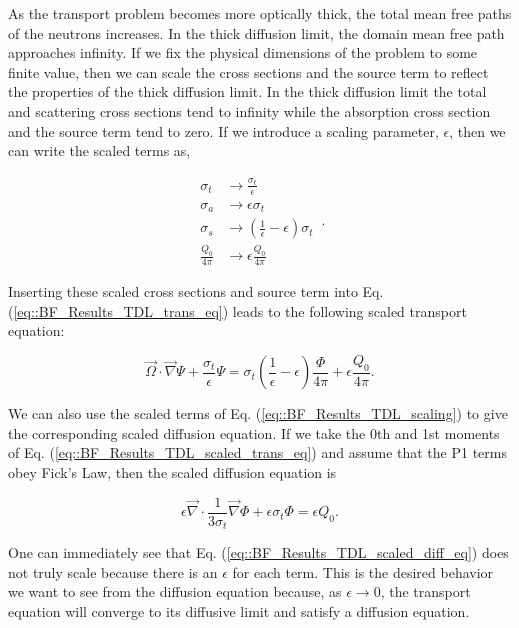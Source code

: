 \noindent As the transport problem becomes more optically thick, the total mean free paths of the neutrons increases. In the thick diffusion limit, the domain mean free path approaches infinity. If we fix the physical dimensions of the problem to some finite value, then we can scale the cross sections and the source term to reflect the properties of the thick diffusion limit. In the thick diffusion limit the total and scattering cross sections tend to infinity while the absorption cross section and the source term tend to zero. If we introduce a scaling parameter, $\epsilon$, then we can write the scaled terms as,

\begin{equation}
\label{eq::BF_Results_TDL_scaling}
\begin{aligned}
	\sigma_t &\rightarrow \frac{\sigma_t}{\epsilon} \\
	\sigma_a &\rightarrow \epsilon \sigma_t\\
	\sigma_s &\rightarrow \left( \frac{1}{\epsilon} - \epsilon   \right) \sigma_t \\
	\frac{Q_0}{4 \pi} &\rightarrow \epsilon \frac{Q_0}{4 \pi}
\end{aligned} \, .
\end{equation}

\noindent Inserting these scaled cross sections and source term into Eq. (\ref{eq::BF_Results_TDL_trans_eq}) leads to the following scaled transport equation:

\begin{equation}
\label{eq::BF_Results_TDL_scaled_trans_eq}
\vec{\Omega} \cdot \vec{\nabla} \Psi + \frac{\sigma_t}{\epsilon} \Psi = \sigma_t \left( \frac{1}{\epsilon} - \epsilon   \right)  \frac{\Phi}{4 \pi} + \epsilon \frac{Q_0}{4 \pi} .
\end{equation}

\noindent We can also use the scaled terms of Eq. (\ref{eq::BF_Results_TDL_scaling}) to give the corresponding scaled diffusion equation. If we take the 0th and 1st moments of Eq. (\ref{eq::BF_Results_TDL_scaled_trans_eq}) and assume that the P1 terms obey Fick's Law, then the scaled diffusion equation is

\begin{equation}
\label{eq::BF_Results_TDL_scaled_diff_eq}
\epsilon \vec{\nabla} \cdot \frac{1}{3 \sigma_t}  \vec{\nabla} \Phi + \epsilon \sigma_t \Phi =  \epsilon Q_0.
\end{equation}

\noindent One can immediately see that Eq. (\ref{eq::BF_Results_TDL_scaled_diff_eq}) does not truly scale because there is an $\epsilon$ for each term. This is the desired behavior we want to see from the diffusion equation because, as $\epsilon \rightarrow 0$, the transport equation will converge to its diffusive limit and satisfy a diffusion equation.

